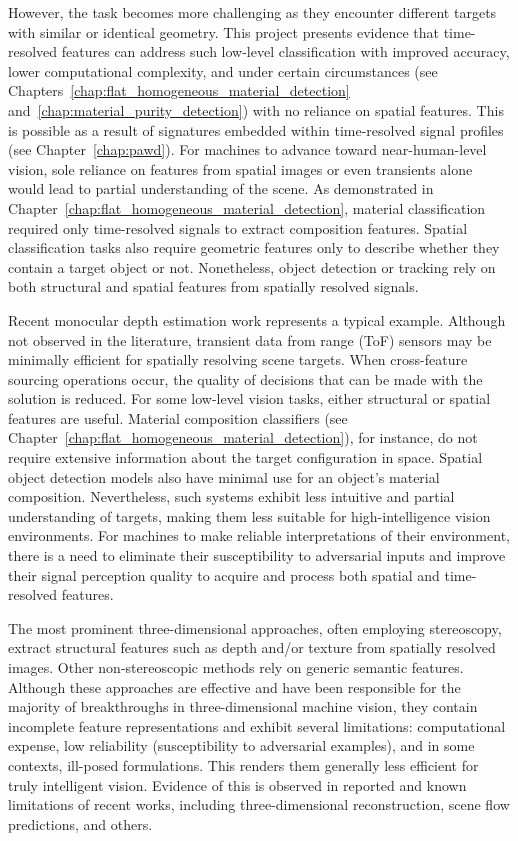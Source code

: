 \documentclass[12pt,a4paper,oneside]{report}
\begin{document}
However, the task becomes more challenging as they encounter different targets with similar or identical geometry. This project presents evidence that time-resolved features can address such low-level classification with improved accuracy, lower computational complexity, and under certain circumstances (see Chapters~\ref{chap:flat_homogeneous_material_detection} and~\ref{chap:material_purity_detection}) with no reliance on spatial features. This is possible as a result of signatures embedded within time-resolved signal profiles (see Chapter~\ref{chap:pawd}). For machines to advance toward near-human-level vision, sole reliance on features from spatial images or even transients alone would lead to partial understanding of the scene. As demonstrated in Chapter~\ref{chap:flat_homogeneous_material_detection}, material classification required only time-resolved signals to extract composition features. Spatial classification tasks also require geometric features only to describe whether they contain a target object or not. Nonetheless, object detection or tracking rely on both structural and spatial features from spatially resolved signals.

Recent monocular depth estimation work \cite{depthpro2024} represents a typical example. Although not observed in the literature, transient data from range (ToF) sensors may be minimally efficient for spatially resolving scene targets. When cross-feature sourcing operations occur, the quality of decisions that can be made with the solution is reduced. For some low-level vision tasks, either structural or spatial features are useful. Material composition classifiers (see Chapter~\ref{chap:flat_homogeneous_material_detection}), for instance, do not require extensive information about the target configuration in space. Spatial object detection models also have minimal use for an object's material composition. Nevertheless, such systems exhibit less intuitive and partial understanding of targets, making them less suitable for high-intelligence vision environments. For machines to make reliable interpretations of their environment, there is a need to eliminate their susceptibility to adversarial inputs and improve their signal perception quality to acquire and process both spatial and time-resolved features.

The most prominent three-dimensional approaches, often employing stereoscopy, extract structural features such as depth and/or texture from spatially resolved images. Other non-stereoscopic methods rely on generic semantic features. Although these approaches are effective and have been responsible for the majority of breakthroughs in three-dimensional machine vision, they contain incomplete feature representations and exhibit several limitations: computational expense, low reliability (susceptibility to adversarial examples), and in some contexts, ill-posed formulations. This renders them generally less efficient for truly intelligent vision. Evidence of this is observed in reported and known limitations of recent works, including three-dimensional reconstruction, scene flow predictions, and others.
\end{document}
